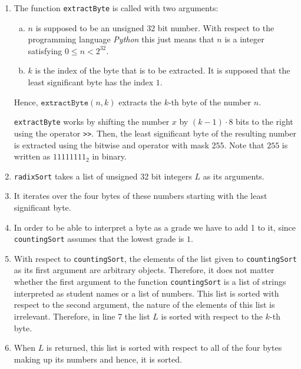 \begin{enumerate}
\item The function \texttt{extractByte} is called with two arguments:
      \begin{enumerate}[(a)]
      \item $n$ is supposed to be an unsigned 32 bit number.  With respect to the programming language
            \textsl{Python} this just means that $n$ is a integer satisfying $0 \leq n < 2^{32}$.
      \item $k$ is the index of the byte that is to be extracted.  It is supposed that the least significant
            byte has the index $1$.
      \end{enumerate}
      Hence, $\texttt{extractByte}(n, k)$ extracts the $k$-th byte of the number $n$.

      \texttt{extractByte} works by shifting the number $x$ by $(k-1) \cdot 8$ bits to the right using the
      operator \texttt{>>}.  Then, the least significant byte of the resulting number is extracted using the 
      bitwise and operator with mask $255$.  Note that $255$ is written as $11111111_2$ in binary. 
\item \texttt{radixSort} takes a list of unsigned 32 bit integers $L$ as its arguments.
\item It iterates over the four bytes of these numbers starting with the least significant byte.
\item In order to be able to interpret a byte as a grade we have to add 1 to it, since \texttt{countingSort}
      assumes that the lowest grade is $1$.  
\item With respect to \texttt{countingSort},  the elements of the list given to \texttt{countingSort} as its first argument are
      arbitrary objects.  Therefore, it does not matter whether the first argument to the function
      \texttt{countingSort} is a list of strings interpreted as student names or a list of numbers.  This list
      is sorted with respect to the second argument, the nature of the elements of this list is
      irrelevant.  Therefore, in line 7 the list $L$ is sorted with respect to the $k$-th byte. 
\item When $L$ is returned, this list is sorted with respect to all of the four bytes making up its numbers and
      hence, it is sorted.
\end{enumerate}

